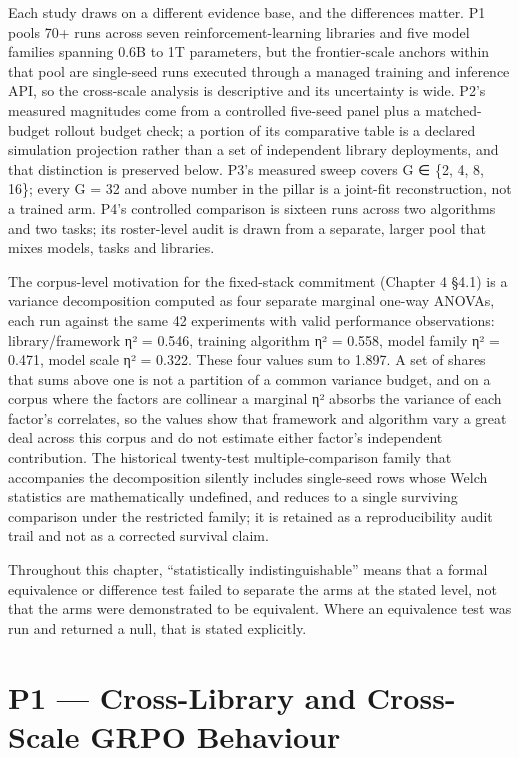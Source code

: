 \documentclass[12pt,a4paper]{report}
\begin{document}
Each study draws on a different evidence base, and the differences
matter. P1 pools 70+ runs across seven reinforcement-learning libraries
and five model families spanning 0.6B to 1T parameters, but the
frontier-scale anchors within that pool are single-seed runs executed
through a managed training and inference API, so the cross-scale
analysis is descriptive and its uncertainty is wide. P2's measured
magnitudes come from a controlled five-seed panel plus a matched-budget
rollout budget check; a portion of its comparative table is a declared
simulation projection rather than a set of independent library
deployments, and that distinction is preserved below. P3's measured
sweep covers G ∈ \{2, 4, 8, 16\}; every G = 32 and above number in the
pillar is a joint-fit reconstruction, not a trained arm. P4's controlled
comparison is sixteen runs across two algorithms and two tasks; its
roster-level audit is drawn from a separate, larger pool that mixes
models, tasks and libraries.

The corpus-level motivation for the fixed-stack commitment (Chapter 4
§4.1) is a variance decomposition computed as four separate marginal
one-way ANOVAs, each run against the same 42 experiments with valid
performance observations: library/framework η² = 0.546, training
algorithm η² = 0.558, model family η² = 0.471, model scale η² = 0.322.
These four values sum to 1.897. A set of shares that sums above one is
not a partition of a common variance budget, and on a corpus where the
factors are collinear a marginal η² absorbs the variance of each
factor's correlates, so the values show that framework and algorithm
vary a great deal across this corpus and do not estimate either factor's
independent contribution. The historical twenty-test multiple-comparison
family that accompanies the decomposition silently includes single-seed
rows whose Welch statistics are mathematically undefined, and reduces to
a single surviving comparison under the restricted family; it is
retained as a reproducibility audit trail and not as a corrected
survival claim.

Throughout this chapter, ``statistically indistinguishable'' means that
a formal equivalence or difference test failed to separate the arms at
the stated level, not that the arms were demonstrated to be equivalent.
Where an equivalence test was run and returned a null, that is stated
explicitly.

\section{P1 --- Cross-Library and Cross-Scale GRPO
Behaviour}\label{p1-cross-library-and-cross-scale-grpo-behaviour}
\end{document}
